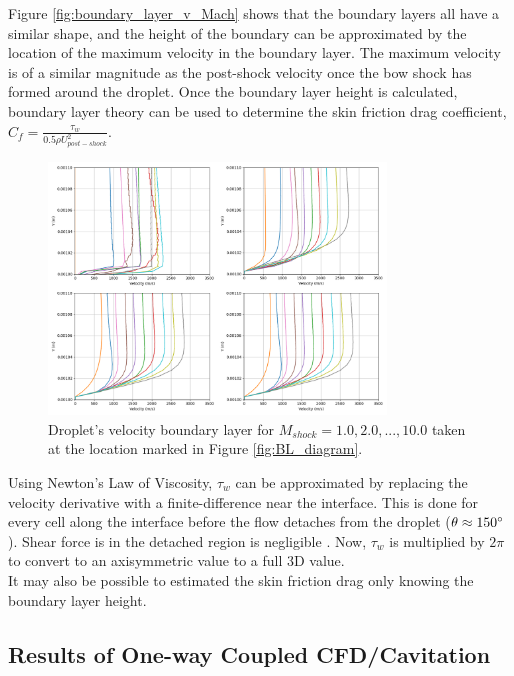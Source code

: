 \documentclass{UCF_ETD}
\begin{document}
Figure \ref{fig:boundary_layer_v_Mach} shows that the boundary layers all have a similar shape, and the height of the boundary can be approximated by the location of the maximum velocity in the boundary layer. The maximum velocity is of a similar magnitude as the post-shock velocity once the bow shock has formed around the droplet.
Once the boundary layer height is calculated, boundary layer theory can be used to determine the skin friction drag coefficient, $C_{f} = \frac{\tau_{w}}{0.5 \rho U^{2}_{post-shock}}$.

\begin{figure}
    \centering
    \includegraphics[width=0.8\textwidth]{Figures/coplotted_BLs.png}
    \caption{Droplet's velocity boundary layer for $M_{shock} = 1.0, 2.0,...,10.0$ taken at the location marked in Figure \ref{fig:BL_diagram}.}
    \label{fig:BL_heigh_v_mach}
\end{figure}

Using Newton's Law of Viscosity, $\tau_{w}$ can be approximated by replacing the velocity derivative with a finite-difference near the interface.
This is done for every cell along the interface before the flow detaches from the droplet ($\theta \approx 150\degree$). Shear force is in the detached region is negligible \cite{Khan2004}. 
Now, $\tau_{w}$ is multiplied by $2\pi$ to convert to an axisymmetric value to a full 3D value. \\
It may also be possible to estimated the skin friction drag only knowing the boundary layer height.


\subsection{Results of One-way Coupled CFD/Cavitation}
\end{document}
